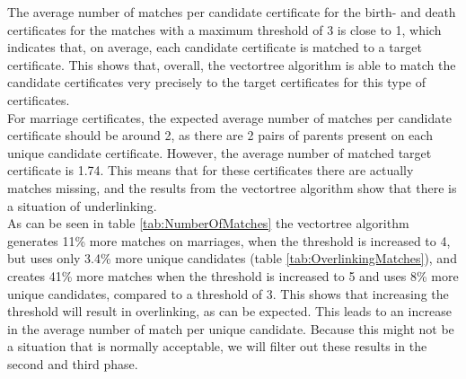 The average number of matches per candidate certificate for the birth- and death certificates for the matches with a maximum threshold of 3 is close to 1, which indicates that, on average, each candidate certificate is matched to a target certificate. This shows that, overall, the vectortree algorithm is able to match the candidate certificates very precisely to the target certificates for this type of certificates. \\

For marriage certificates, the expected average number of matches per candidate certificate should be around 2, as there are 2 pairs of parents present on each unique candidate certificate. However, the average number of matched target certificate is 1.74. This means that for these certificates there are actually matches missing, and the results from the vectortree algorithm show that there is a situation of underlinking. \\

As can be seen in table \ref{tab:NumberOfMatches} the vectortree algorithm generates 11\% more matches on marriages, when the threshold is increased to 4, but uses only 3.4\% more unique candidates (table \ref{tab:OverlinkingMatches}), and creates 41\% more matches when the threshold is increased to 5 and uses 8\% more unique candidates, compared to a threshold of 3. This shows that increasing the threshold will result in overlinking, as can be expected. This leads to an increase in the average number of match per unique candidate. Because this might not be a situation that is normally acceptable, we will filter out these results in the second and third phase.


